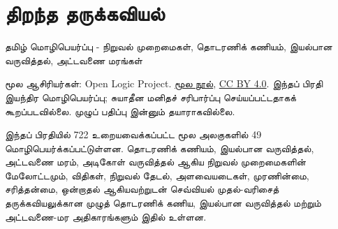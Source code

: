 \documentclass[11pt,a4paper,openany]{memoir}
\begin{document}
\raggedright
\pagestyle{plain}
\chapter*{திறந்த தருக்கவியல்}
\noindent தமிழ் மொழிபெயர்ப்பு - நிறுவல் முறைமைகள், தொடரணிக் கணியம்,
இயல்பான வருவித்தல், அட்டவணை மரங்கள்

\noindent மூல ஆசிரியர்கள்: Open Logic Project.
\href{https://github.com/OpenLogicProject/OpenLogic}{மூல நூல்},
\href{https://creativecommons.org/licenses/by/4.0/}{CC BY 4.0}.
இந்தப் பிரதி இயந்திர மொழிபெயர்ப்பு; சுயாதீன மனிதச் சரிபார்ப்பு செய்யப்பட்டதாகக்
கூறப்படவில்லை. முழுப் பதிப்பு இன்னும் தயாராகவில்லை.

\noindent இந்தப் பிரதியில் 722 உறையவைக்கப்பட்ட மூல அலகுகளில் 49
மொழிபெயர்க்கப்பட்டுள்ளன. தொடரணிக் கணியம், இயல்பான வருவித்தல், அட்டவணை மரம்,
அடிகோள் வருவித்தல் ஆகிய நிறுவல் முறைமைகளின் மேலோட்டமும், விதிகள், நிறுவல்
தேடல், அளவையடைகள், முரணின்மை, சரித்தன்மை, ஒன்றாதல் ஆகியவற்றுடன் செவ்வியல்
முதல்-வரிசைத் தருக்கவியலுக்கான முழுத் தொடரணிக் கணிய, இயல்பான வருவித்தல்
மற்றும் அட்டவணை-மர அதிகாரங்களும் இதில் உள்ளன.

\clearpage
\tableofcontents*




\end{document}
